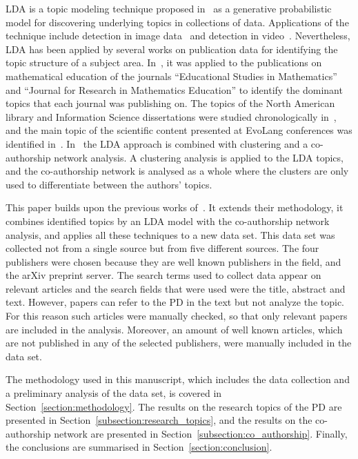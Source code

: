 \documentclass{article}
\theoremstyle{definition}
\begin{document}
LDA is a topic modeling technique proposed
in~\cite{Blei2003} as a generative probabilistic model for discovering
underlying topics in collections of data.
Applications of the technique include detection in image data~\cite{
Coelho2010} and detection in video~\cite{Wang2008}. Nevertheless,
LDA has been applied by several works on publication data for identifying the
topic structure of a subject area. In~\cite{Inglis2018}, it was applied to the
publications on mathematical education of the journals ``Educational Studies in
Mathematics'' and ``Journal for Research in Mathematics Education'' to
identify the dominant topics that each journal was publishing on. The topics of
the North American library and Information Science dissertations were 
studied chronologically in~\cite{Sugimoto2011}, and the main topic of the
scientific content presented at EvoLang conferences was identified
in~\cite{Bergmann2018}. In~\cite{Bergmann2018} the LDA approach is combined with
clustering and a co-authorship network analysis. A clustering analysis is
applied to the LDA topics, and the co-authorship network is analysed as a whole
where the clusters are only used to differentiate between the authors' topics.

This paper builds upon the previous works of~\cite{Bergmann2018, Liu2015,
youngblood2018}. It extends their methodology, it combines identified topics by
an LDA model with the co-authorship network analysis, and applies all these
techniques to a new data set. This data set was collected not from a single
source but from five different sources. The four publishers were chosen because
they are well known publishers in the field, and the arXiv preprint server. 
The search
terms used to collect data appear on relevant articles and the search fields
that were used were the title, abstract and text. However, papers can refer to
the PD in the text but not analyze the topic. For this reason such articles were
manually checked, so that only relevant papers are included in the analysis.
Moreover, an amount of well
known articles, which are not published in any of the selected publishers, were
manually included in the data set.

The methodology used in this manuscript, which
includes the data collection and a preliminary analysis of the data set, is
covered in Section~\ref{section:methodology}. The results on the research topics
of the PD are presented in Section~\ref{subsection:research_topics}, and the
results on the co-authorship network are presented in
Section~\ref{subsection:co_authorship}. Finally, the conclusions are summarised
in Section~\ref{section:conclusion}.
\end{document}
